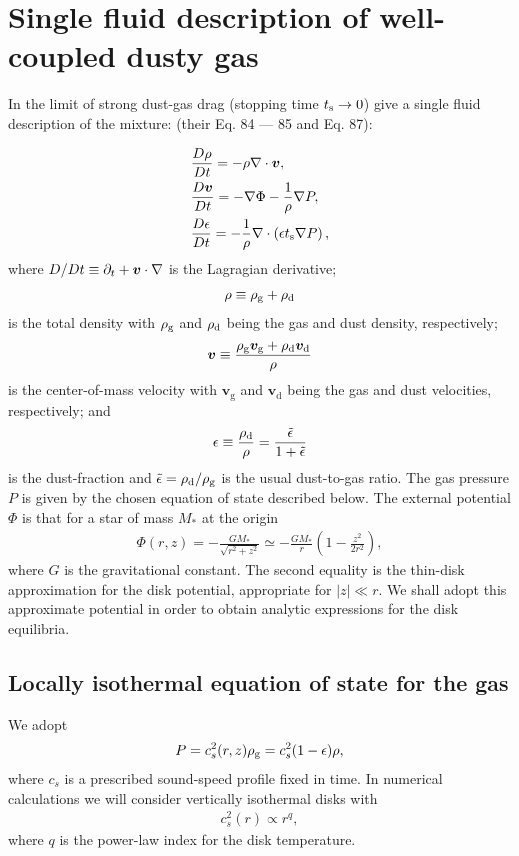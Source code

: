 \section{Single fluid description of well-coupled dusty gas}\label{setup} 
In the limit of strong dust-gas drag (stopping time $t_\mathrm{s}\to 0$) 
\cite{laibe14} give a single fluid description of the mixture:  
(their Eq. 84 --- 85 and Eq. 87): 

\begin{align}
  &\frac{D\rho}{Dt} = -\rho\nabla\cdot\bm{v}, \label{masseq}\\ 
  &\frac{D\bm{v}}{Dt} = - \nabla\Phi - \frac{1}{\rho}\nabla
  P, \label{momeq}\\ 
  &\frac{D\epsilon}{Dt} = -\frac{1}{\rho} \nabla \cdot \left(\epsilon 
  t_\mathrm{s} \nabla P \right),\label{dusteq}  
\end{align}
where $D/Dt \equiv \partial_t + \bm{v}\cdot\nabla$ is the Lagragian
derivative; 
\begin{align}
  \rho \equiv \rho_\mathrm{g} + \rho_\mathrm{d}
\end{align}
is the total density with $\rho_\mathrm{g}$ and $\rho_\mathrm{d}$ being the gas and dust
density, respectively; 
\begin{align}
  \bm{v} \equiv \frac{\rho_\mathrm{g}\bm{v}_\mathrm{g} + 
    \rho_\mathrm{d}\bm{v}_\mathrm{d}}{\rho}
\end{align}
is the center-of-mass velocity with $\bm{v}_\mathrm{g}$ and
$\bm{v}_\mathrm{d}$ being the gas and dust velocities, respectively; 
and 
\begin{align}
  \epsilon \equiv \frac{\rho_\mathrm{d}}{\rho}  = \frac{\tilde{\epsilon}}{1+\tilde{\epsilon}} 
\end{align}
is the dust-fraction and $\tilde{\epsilon}=\rho_\mathrm{d}/\rho_\mathrm{g}$ is the usual
dust-to-gas ratio. The gas pressure $P$ is given by the chosen 
equation of state described below. The external potential $\Phi$ is
that for a star of mass $M_*$ at the origin 
\begin{align}\label{thin_disk_potential}
  \Phi(r,z) =-\frac{GM_*}{\sqrt{r^2 + z^2}}\simeq
  -\frac{GM_*}{r}\left(1 - \frac{z^2}{2r^2}\right), 
\end{align}
where $G$ is the gravitational constant. The second equality is the 
thin-disk approximation for the disk potential, appropriate for
$|z|\ll r$. We shall adopt this approximate potential in order to
obtain analytic expressions for the disk equilibria.  


\subsection{Locally isothermal equation of state for the gas} 
We adopt 
\begin{align}\label{eos}
  P = c_s^2(r,z)\rho_\mathrm{g} = c_s^{2}(1 - \epsilon)\rho,   
\end{align}
where $c_s$ is a prescribed sound-speed profile fixed in time.  
In numerical calculations we will consider vertically  
isothermal disks with 
\begin{align}
  c_s^2(r) \propto r^{q},
\end{align}
where $q$ is the power-law index for the disk temperature. 

